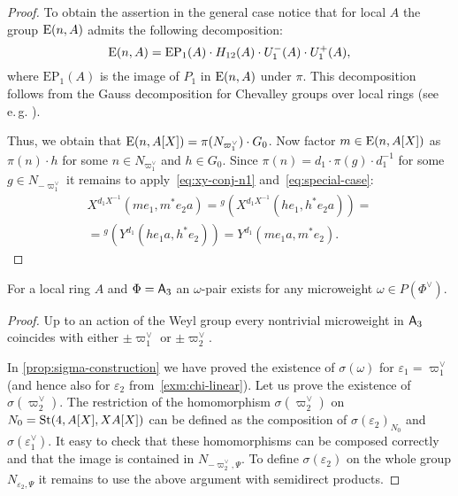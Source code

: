 \begin{proof}
    To obtain the assertion in the general case notice that for local $A$ the group $\operatorname{E}(n, A)$ admits the following decomposition:
    \[\operatorname{E}(n, A) = \mathrm{EP}_1(A) \cdot H_{12}(A) \cdot U^-_1(A) \cdot U^+_1(A), \]
    where $\mathrm{EP}_1(A)$ is the image of $P_1$ in $\operatorname{E}(n, A)$ under $\pi$.
    This decomposition follows from the Gauss decomposition for Chevalley groups over local rings (see e.\,g. \cite[Theorem~1.1]{Sm12}).

    Thus, we obtain that $\operatorname{E}(n, A[X]) = \pi(N_{\varpi_1^\vee}) \cdot G_0$.
    Now factor $m \in \operatorname{E}(n, A[X])$ as $\pi(n) \cdot h$ for some $n\in N_{\varpi_1^\vee}$ and $h \in G_0$.
    Since $\pi(n) = d_1 \cdot \pi(g) \cdot d_1^{-1}$ for some $g \in N_{-\varpi_1^\vee}$ it remains to apply~\eqref{eq:xy-conj-n1} and~\eqref{eq:special-case}:
    \begin{multline}
        \nonumber X^{d_1 X^{-1}}(me_1, m^*e_{2}a) = {}^{g}(X^{d_1 X^{-1}}(he_1, h^*e_{2}a)) = \\
        = {}^{g}(Y^{d_1}(he_{1}a, h^*e_2)) = Y^{d_1}(me_{1}a, m^{*} e_{2}).
    \end{multline}
\end{proof}

\begin{cor} \label{cor:a3-microweight}
    For a local ring $A$ and $\Phi = \mathsf{A}_3$ an $\omega$-pair exists for any microweight $\omega \in P(\Phi^\vee)$.
\end{cor}
\begin{proof}
    Up to an action of the Weyl group every nontrivial microweight in $\mathsf{A}_3$ coincides with either
    $\pm\varpi_1^\vee$ or $\pm\varpi_2^\vee$.

    In \cref{prop:sigma-construction} we have proved the existence of $\sigma(\omega)$ for $\varepsilon_1 = \varpi_1^\vee$ (and hence also for $\varepsilon_2$ from~\cref{exm:chi-linear}).
    Let us prove the existence of $\sigma(\varpi_2^\vee)$.
    The restriction of the homomorphism $\sigma(\varpi_2^\vee)$ on $N_0 = \operatorname{St}(4, A[X], XA[X])$ can be defined as the composition of
     $\sigma(\varepsilon_2)_{N_0}$ and $\sigma(\varepsilon_1^\vee)$.
    It easy to check that these homomorphisms can be composed correctly and that the image is contained in $N_{-\varpi_2^\vee, \Psi}$.
    To define $\sigma(\varepsilon_2)$ on the whole group $N_{\varepsilon_2, \Psi}$ it remains to use the above argument with semidirect products.
\end{proof}

